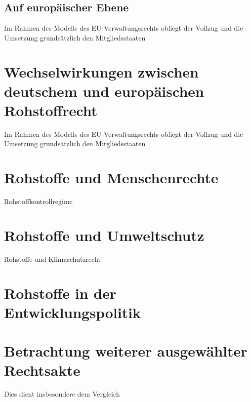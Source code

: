 \documentclass[12pt,a4paper,oneside]{book} %
\begin{document}
	\subsection{Auf europäischer Ebene}
	
	Im Rahmen des Modells des EU-Verwaltungsrechts obliegt der Vollzug und die Umsetzung grundsätzlich den Mitgliedsstaaten
	
	\section{Wechselwirkungen zwischen deutschem und europäischen Rohstoffrecht}
		Im Rahmen des Modells des EU-Verwaltungsrechts obliegt der Vollzug und die Umsetzung grundsätzlich den Mitgliedsstaaten
	
	\section{Rohstoffe und Menschenrechte}
	
	Rohstoffkontrollregime
	
	\section{Rohstoffe und Umweltschutz}
	
	Rohstoffe und Klimaschutzrecht
	
	
	\section{Rohstoffe in der Entwicklungspolitik}
	
	\section{Betrachtung weiterer ausgewählter Rechtsakte}
	
	Dies dient insbesondere dem Vergleich 
	
\end{document}
